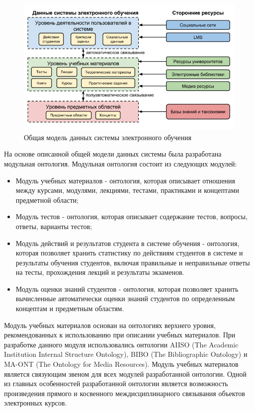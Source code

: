 \begin{figure}[ht] 
  \center
  \includegraphics[scale=0.5]{OverallModel}
  \caption{Общая модель данных системы электронного обучения} 
  \label{fig:OverallModel}
\end{figure}

На основе описанной общей модели данных системы была разработана модульная онтология. Модульная онтология состоит из следующих модулей:


\begin{itemize}
\item Модуль учебных материалов - онтология, которая описывает отношения между курсами, модулями, лекциями, тестами, практиками и концептами предметной области;
\item Модуль тестов - онтология, которая описывает содержание тестов, вопросы, ответы, варианты тестов;
\item Модуль действий и результатов студента в системе обучения - онтология, которая позволяет хранить статистику по действиям студентов в системе и результаты обучения студентов, включая правильные и неправильные ответы на тесты, прохождения лекций и результаты экзаменов.
\item Модуль оценки знаний студентов - онтология, которая позволяет хранить вычисленные автоматически оценки знаний студентов по определенным концептам и предметным областям.
\end{itemize}

Модуль учебных материалов основан на онтологиях верхнего уровня, рекомендованных к использованию при описании учебных материалов. При разработке данного модуля использовались онтологии AIISO (The Academic Institution Internal Structure Ontology), BIBO (The Bibliographic Ontology) и MA-ONT (The Ontology for Media Resources). Модуль учебных материалов является связующим звеном для всех модулей разработанной онтологии. Одной из главных особенностей разработанной онтологии является возможность произведения прямого и косвенного междисциплинарного связывания объектов электронных курсов. 




